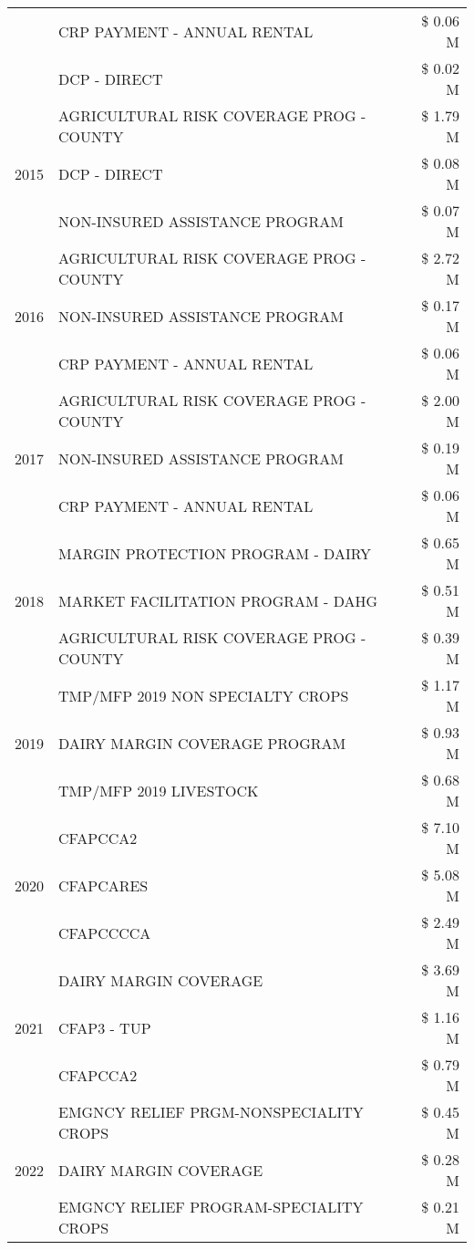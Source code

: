 \begin{tabular}{llr}
 & CRP PAYMENT - ANNUAL RENTAL & \$ 0.06 M \\
 & DCP - DIRECT & \$ 0.02 M \\
\cline{1-3}
\multirow[t]{3}{*}{2015} & AGRICULTURAL RISK COVERAGE PROG - COUNTY & \$ 1.79 M \\
 & DCP - DIRECT & \$ 0.08 M \\
 & NON-INSURED ASSISTANCE PROGRAM & \$ 0.07 M \\
\cline{1-3}
\multirow[t]{3}{*}{2016} & AGRICULTURAL RISK COVERAGE PROG - COUNTY & \$ 2.72 M \\
 & NON-INSURED ASSISTANCE PROGRAM & \$ 0.17 M \\
 & CRP PAYMENT - ANNUAL RENTAL & \$ 0.06 M \\
\cline{1-3}
\multirow[t]{3}{*}{2017} & AGRICULTURAL RISK COVERAGE PROG - COUNTY & \$ 2.00 M \\
 & NON-INSURED ASSISTANCE PROGRAM & \$ 0.19 M \\
 & CRP PAYMENT - ANNUAL RENTAL & \$ 0.06 M \\
\cline{1-3}
\multirow[t]{3}{*}{2018} & MARGIN PROTECTION PROGRAM - DAIRY & \$ 0.65 M \\
 & MARKET FACILITATION PROGRAM - DAHG & \$ 0.51 M \\
 & AGRICULTURAL RISK COVERAGE PROG - COUNTY & \$ 0.39 M \\
\cline{1-3}
\multirow[t]{3}{*}{2019} & TMP/MFP 2019 NON SPECIALTY CROPS & \$ 1.17 M \\
 & DAIRY MARGIN COVERAGE PROGRAM & \$ 0.93 M \\
 & TMP/MFP 2019 LIVESTOCK & \$ 0.68 M \\
\cline{1-3}
\multirow[t]{3}{*}{2020} & CFAPCCA2 & \$ 7.10 M \\
 & CFAPCARES & \$ 5.08 M \\
 & CFAPCCCCA & \$ 2.49 M \\
\cline{1-3}
\multirow[t]{3}{*}{2021} & DAIRY MARGIN COVERAGE & \$ 3.69 M \\
 & CFAP3 - TUP & \$ 1.16 M \\
 & CFAPCCA2 & \$ 0.79 M \\
\cline{1-3}
\multirow[t]{3}{*}{2022} & EMGNCY RELIEF PRGM-NONSPECIALITY CROPS & \$ 0.45 M \\
 & DAIRY MARGIN COVERAGE & \$ 0.28 M \\
 & EMGNCY RELIEF PROGRAM-SPECIALITY CROPS & \$ 0.21 M \\
\cline{1-3}
\bottomrule
\end{tabular}
